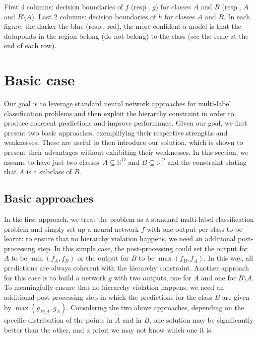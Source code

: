 \documentclass{article}
\begin{document}
\begin{figure*}[t]
{ First 4 columns: decision boundaries of $f$ (resp., $g$) for classes $A$ and $B$ (resp., $A$ and $B \setminus A$). Last 2 columns: decision boundaries of $h$ for classes $A$ and $B$. In each figure, the darker the blue (resp., red), the more confident a model is that the datapoints in the region belong (do not belong) to the class (see the scale at the end of each row).
\vspace*{-1.5ex}
}
\label{fig:dec_bound_figs}
\end{figure*}

\section{Basic case}\label{sec:basic_case}







Our goal is to leverage standard neural network approaches for multi-label classification problems and then exploit the hierarchy constraint in order to produce coherent predictions and improve performance.
Given our goal,
we first present two basic approaches, 
exemplifying their respective strengths and weaknesses. These are useful to then introduce our solution, which
is shown to present their advantages without exhibiting their weaknesses. In this section, we assume to have just two classes~$A \subseteq \mathbb{R}^D$ and $B \subseteq \mathbb{R}^D$ and the constraint stating that $A$ is a subclass of $B$. 

\subsection{Basic approaches}\label{subsec:approaches}

In the first approach, we treat the problem as a standard multi-label classification problem and simply set up a neural network $f$ with one output per class to be learnt: to ensure that no hierarchy violation happens, we need an additional post-processing step. In this simple case, the post-processing could set the output for $A$ to be $\min(f_A, f_B)$ or the output for $B$ to be $\max(f_B, f_A)$. In this way, all predictions are always coherent with the hierarchy constraint.
Another approach for this case is to build a network $g$ with two outputs, one for $A$ and one for $B\setminus A$. To meaningfully ensure that no hierarchy violation happens, we need an additional post-processing step in which the predictions for the class $B$ are given by $\max(g_{B\setminus A}, g_A)$.
Considering the two above approaches, depending on the specific distribution of the points in $A$ and in $B$, one solution may be significantly better than the other, and a priori we may not know which one it is.
\end{document}
